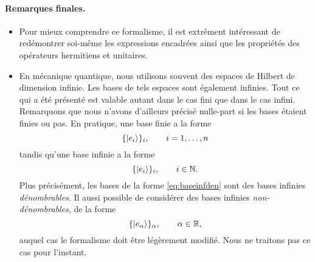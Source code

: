 \documentclass[11pt,a4paper,oneside]{article}
\begin{document}
\paragraph{Remarques finales.} 
\begin{itemize}[label=\tb]
    \item Pour mieux comprendre ce formalisme, il est extrêment intéressant de redémontrer soi-même les expressions encadrées ainsi que les propriétés des opérateurs hermitiens et unitaires.
    \item En mécanique quantique, nous utilisons souvent des espaces de Hilbert de dimension infinie. Les bases de tels espaces sont également infinies. Tout ce qui a été présenté est valable autant dans le cas fini que dans le cas infini. Remarquons que nous n'avons d'ailleurs précisé nulle-part si les bases étaient finies ou pas. En pratique, une base finie a la forme
    \begin{equation}
        \{\ket{e_i}\}_i, \qquad i=1,\dots,n
    \end{equation}
    tandis qu'une base infinie a la forme
    \begin{equation}
        \{\ket{e_i}\}_i, \qquad i\in\mathbb{N}.\label{eq:baseinfden}
    \end{equation}
    Plus précisément, les bases de la forme \eqref{eq:baseinfden} sont des bases infinies \emph{dénombrables}. Il aussi possible de considérer des bases infinies \emph{non-dénombrables}, de la forme
    \begin{equation}
        \{\ket{e_\alpha}\}_\alpha, \qquad \alpha\in\mathbb{R},
    \end{equation}
    auquel cas le formalisme doit être légèrement modifié. Nous ne traitons pas ce cas pour l'instant.
\end{itemize}
\end{document}
